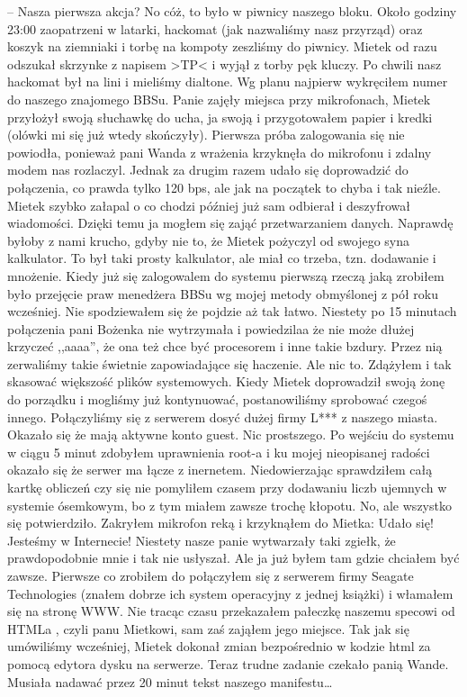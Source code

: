 \documentclass[a4paper,polish,titlepage,12pt]{article}
\begin{document}
-- Nasza pierwsza akcja? No cóż, to było w piwnicy naszego bloku. Około godziny 23:00 zaopatrzeni w latarki, hackomat (jak nazwaliśmy nasz przyrząd) oraz koszyk na ziemniaki
i torbę na kompoty zeszliśmy do piwnicy. Mietek od razu odszukał skrzynke z napisem >TP< i wyjął z torby pęk kluczy. Po chwili nasz hackomat był na lini i mieliśmy dialtone.
Wg planu najpierw wykręciłem numer do naszego znajomego BBSu. Panie zajęły miejsca przy mikrofonach, Mietek przyłożył swoją słuchawkę do ucha, ja swoją i przygotowałem papier
i kredki (olówki mi się już wtedy skończyły). Pierwsza próba zalogowania się nie powiodła, ponieważ pani Wanda z wrażenia krzyknęła do mikrofonu i zdalny modem nas rozlaczyl.
Jednak za drugim razem udało się doprowadzić do połączenia, co prawda tylko 120 bps, ale jak na początek to chyba i tak nieźle. Mietek szybko załapal o co chodzi później już
sam odbierał i deszyfrował wiadomości. Dzięki temu ja mogłem się zająć przetwarzaniem danych. Naprawdę byłoby z nami krucho, gdyby nie to, że Mietek pożyczyl od swojego syna
kalkulator. To był taki prosty kalkulator, ale miał co trzeba, tzn. dodawanie i mnożenie. Kiedy już się zalogowalem do systemu pierwszą rzeczą jaką zrobiłem było przejęcie
praw menedżera BBSu wg mojej metody obmyślonej z pół roku wcześniej. Nie spodziewałem się że pojdzie aż tak łatwo. Niestety po 15 minutach połączenia pani Bożenka nie
wytrzymała i powiedzilaa że nie może dłużej krzyczeć ,,aaaa'', że ona też chce być procesorem i inne takie bzdury. Przez nią zerwaliśmy takie świetnie zapowiadające się
haczenie. Ale nic to. Zdążyłem i tak skasować większość plików systemowych. Kiedy Mietek doprowadził swoją żonę do porządku i mogliśmy już kontynuować, postanowiliśmy
sprobować czegoś innego. Połączyliśmy się z serwerem dosyć dużej firmy L*** z naszego miasta. Okazało się że mają aktywne konto guest. Nic prostszego. Po wejściu do systemu w
ciągu 5 minut zdobyłem uprawnienia root-a i ku mojej nieopisanej radości okazało się że serwer ma łącze z inernetem. Niedowierzając sprawdziłem całą kartkę obliczeń czy się
nie pomyliłem czasem przy dodawaniu liczb ujemnych w systemie ósemkowym, bo z tym miałem zawsze trochę kłopotu. No, ale wszystko się potwierdziło. Zakryłem mikrofon reką i
krzyknąłem do Mietka: Udało się! Jesteśmy w Internecie! Niestety nasze panie wytwarzały taki zgiełk, że prawdopodobnie mnie i tak nie usłyszał. Ale ja już byłem tam gdzie
chciałem być zawsze. Pierwsze co zrobiłem do połączyłem się z serwerem firmy Seagate Technologies (znałem dobrze ich system operacyjny z jednej książki) i włamałem się na 
stronę WWW. Nie tracąc czasu przekazałem pałeczkę naszemu specowi od HTMLa , czyli panu Mietkowi, sam zaś zająłem jego miejsce. Tak jak się umówiliśmy wcześniej, Mietek
dokonał zmian bezpośrednio w kodzie html za pomocą edytora dysku na serwerze. Teraz trudne zadanie czekało panią Wande. Musiała nadawać przez 20 minut tekst naszego manifestu\dots
\end{document}
